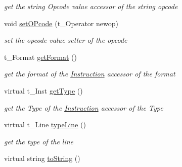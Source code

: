 \begin{DoxyCompactItemize}
\begin{DoxyCompactList}\small\item\em get the string Opcode value accessor of the string opcode \item\end{DoxyCompactList}\item 
\hypertarget{classInstruction_af679b991cc01ab560863e6f428703a49}{
void \hyperlink{classInstruction_af679b991cc01ab560863e6f428703a49}{setOPcode} (t\_\-Operator newop)}
\label{classInstruction_af679b991cc01ab560863e6f428703a49}

\begin{DoxyCompactList}\small\item\em set the opcode value setter of the opcode \item\end{DoxyCompactList}\item 
\hypertarget{classInstruction_a001e765d27e7d59bbca718284ab0a2e3}{
t\_\-Format \hyperlink{classInstruction_a001e765d27e7d59bbca718284ab0a2e3}{getFormat} ()}
\label{classInstruction_a001e765d27e7d59bbca718284ab0a2e3}

\begin{DoxyCompactList}\small\item\em get the format of the \hyperlink{classInstruction}{Instruction} accessor of the format \item\end{DoxyCompactList}\item 
\hypertarget{classInstruction_aeef5ced47cdd5477ba0809bf372b8a72}{
virtual t\_\-Inst \hyperlink{classInstruction_aeef5ced47cdd5477ba0809bf372b8a72}{getType} ()}
\label{classInstruction_aeef5ced47cdd5477ba0809bf372b8a72}

\begin{DoxyCompactList}\small\item\em get the Type of the \hyperlink{classInstruction}{Instruction} accessor of the Type \item\end{DoxyCompactList}\item 
\hypertarget{classInstruction_ad14cb84b8fa70f3e47271d72f7c640a4}{
virtual t\_\-Line \hyperlink{classInstruction_ad14cb84b8fa70f3e47271d72f7c640a4}{typeLine} ()}
\label{classInstruction_ad14cb84b8fa70f3e47271d72f7c640a4}

\begin{DoxyCompactList}\small\item\em get the type of the line \item\end{DoxyCompactList}\item 
\hypertarget{classInstruction_ad892da43543a6b385962a4992fbc76b5}{
virtual string \hyperlink{classInstruction_ad892da43543a6b385962a4992fbc76b5}{toString} ()}
\label{classInstruction_ad892da43543a6b385962a4992fbc76b5}


\end{DoxyCompactItemize}
